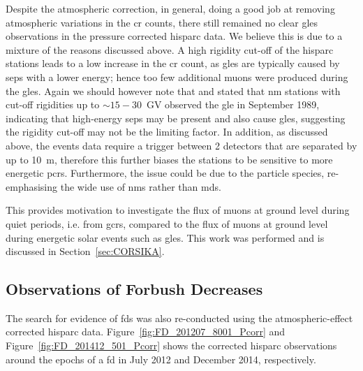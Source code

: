 Despite the atmospheric correction, in general, doing a good job at removing atmospheric variations in the \gls{cr} counts, there still remained no clear \glspl{gle} observations in the pressure corrected \gls{hisparc} data. We believe this is due to a mixture of the reasons discussed above. A high rigidity cut-off of the \gls{hisparc} stations leads to a low increase in the \gls{cr} count, as \glspl{gle} are typically caused by \glspl{sep} with a lower energy; hence too few additional muons were produced during the \glspl{gle}. Again we should however note that \citet{humble_j._e._detection_2012} and \citet{lovell_extended_1998} stated that \gls{nm} stations with cut-off rigidities up to $\sim 15-30$~GV observed the \gls{gle} in September 1989, indicating that high-energy \glspl{sep} may be present and also cause \glspl{gle}, suggesting the rigidity cut-off may not be the limiting factor. In addition, as discussed above, the events data require a trigger between 2 detectors that are separated by up to 10~m, therefore this further biases the stations to be sensitive to more energetic \glspl{pcr}. Furthermore, the issue could be due to the particle species, re-emphasising the wide use of \glspl{nm} rather than \glspl{md}.

This provides motivation to investigate the flux of muons at ground level during quiet periods, i.e. from \glspl{gcr}, compared to the flux of muons at ground level during energetic solar events such as \glspl{gle}. This work was performed and is discussed in Section~\ref{sec:CORSIKA}.


\subsection{Observations of Forbush Decreases}

The search for evidence of \glspl{fd} was also re-conducted using the atmospheric-effect corrected \gls{hisparc} data. Figure~\ref{fig:FD_201207_8001_Pcorr} and Figure~\ref{fig:FD_201412_501_Pcorr} shows the corrected \gls{hisparc} observations around the epochs of a \gls{fd} in July 2012 and December 2014, respectively.

